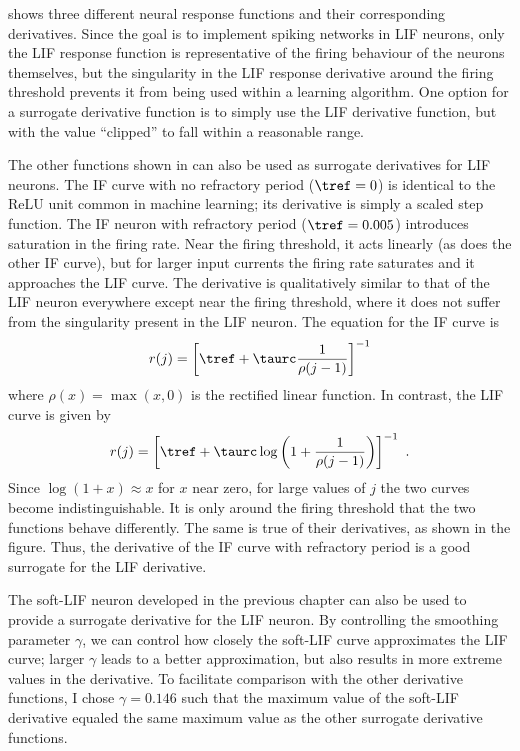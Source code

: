  shows three different neural response functions
and their corresponding derivatives.
Since the goal is to implement spiking networks in LIF neurons,
only the LIF response function is representative
of the firing behaviour of the neurons themselves,
but the singularity in the LIF response derivative around the firing threshold
prevents it from being used within a learning algorithm.
One option for a surrogate derivative function
is to simply use the LIF derivative function,
but with the value ``clipped'' to fall within a reasonable range.

The other functions shown in 
can also be used as surrogate derivatives for LIF neurons.
The IF curve with no refractory period ($\tref = 0$)
is identical to the ReLU unit common in machine learning;
its derivative is simply a scaled step function.
The IF neuron with refractory period ($\tref = 0.005$)
introduces saturation in the firing rate.
Near the firing threshold, it acts linearly (as does the other IF curve),
but for larger input currents the firing rate saturates
and it approaches the LIF curve.
The derivative is qualitatively similar to that of the LIF neuron
everywhere except near the firing threshold,
where it does not suffer from the singularity present in the LIF neuron.
The equation for the IF curve is
\begin{align}
  r(j) = \left[\tref + \taurc \frac{1}{\rho(j - 1)}\right]^{-1}
\end{align}
where $\rho(x) = \max(x, 0)$ is the rectified linear function.
In contrast, the LIF curve is given by
\begin{align}
  r(j) = \left[\tref + \taurc \log\left(1 + \frac{1}{\rho(j - 1)}\right)\right]^{-1} \text{ .}
\end{align}
Since $\log(1 + x) \approx x$ for $x$ near zero,
for large values of $j$ the two curves become indistinguishable.
It is only around the firing threshold that the two functions behave differently.
The same is true of their derivatives, as shown in the figure.
Thus, the derivative of the IF curve with refractory period
is a good surrogate for the LIF derivative.

The soft-LIF neuron developed in the previous chapter
can also be used to provide a surrogate derivative for the LIF neuron.
By controlling the smoothing parameter $\gamma$,
we can control how closely the soft-LIF curve approximates the LIF curve;
larger $\gamma$ leads to a better approximation,
but also results in more extreme values in the derivative.
To facilitate comparison with the other derivative functions,
I chose $\gamma = 0.146$ such that the maximum value of the soft-LIF derivative
equaled the same maximum value as the other surrogate derivative functions.

